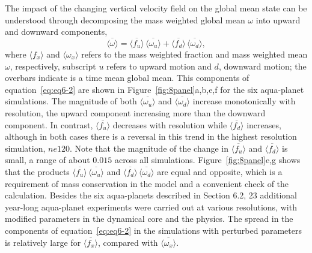 {The impact of the changing vertical velocity field on the global mean state can be understood through decomposing the mass weighted global mean $\omega$ into upward and downward components,
\begin{equation}
\overline{\langle \omega \rangle} = \overline{\langle f_{u} \rangle} \, \overline{\langle \omega_{u} \rangle} + \overline{\langle f_{d} \rangle} \, \overline{\langle \omega_{d} \rangle}, \label{eq:eq6-2}
\end{equation}
where $\langle f_x \rangle$ and $\langle \omega_x \rangle$ refers to the mass weighted fraction and mass weighted mean $\omega$, respectively, subscript $u$ refers to upward motion and $d$, downward motion; the overbars indicate is a time mean global mean. This components of equation~\ref{eq:eq6-2} are shown in Figure~\ref{fig:8panel}a,b,e,f for the six aqua-planet simulations. The magnitude of both $\overline{\langle \omega_{u} \rangle}$ and $\overline{\langle \omega_{d} \rangle}$ increase monotonically with resolution, the upward component increasing more than the downward component. In contrast, $\overline{\langle f_{u} \rangle}$ decreases with resolution while $\overline{\langle f_{d} \rangle}$ increases, although in both cases there is a reversal in this trend in the highest resolution simulation, $ne120$. Note that the magnitude of the change in $\overline{\langle f_{u} \rangle}$ and $\overline{\langle f_{d} \rangle}$ is small, a range of about $0.015$ across all simulations. Figure~\ref{fig:8panel}e,g shows that the products  $\overline{\langle f_{u} \rangle} \, \overline{\langle \omega_{u} \rangle}$ and $\overline{\langle f_{d} \rangle} \, \overline{\langle \omega_{d} \rangle}$ are equal and opposite, which is a requirement of mass conservation in the model and a convenient check of the calculation. Besides the six aqua-planets described in Section 6.2, 23 additional year-long aqua-planet experiments were carried out at various resolutions, with modified parameters in the dynamical core and the physics. The spread in the components of equation~\ref{eq:eq6-2} in the simulations with perturbed parameters is relatively large for $\overline{\langle f_{x} \rangle}$, compared with $\overline{\langle \omega_{x} \rangle}$.

}
